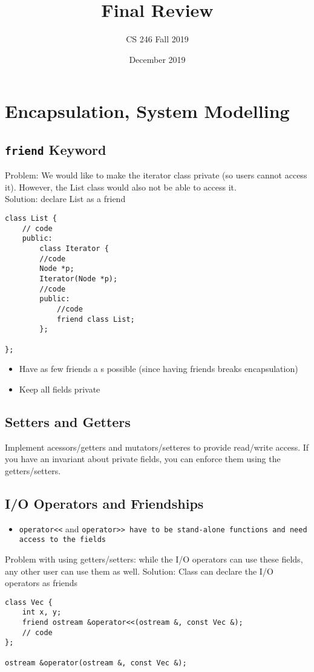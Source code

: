 \documentclass[12pt]{article}
\title{Final Review}
\author{CS 246 Fall 2019}
\date{December 2019}
\begin{document}
\maketitle

\tableofcontents\newpage

\section{Encapsulation, System Modelling}
\subsection{\lstinline{friend} Keyword}
Problem: We would like to make the iterator class private (so users cannot access it). However, the List class would also not be able to access it.\\
Solution: declare List as a friend
\begin{lstlisting}
class List {
    // code
    public:
        class Iterator {
        //code
        Node *p;
        Iterator(Node *p);
        //code
        public:
            //code
            friend class List;
        };

};
\end{lstlisting}
\begin{itemize}
    \item Have as few friends a  s possible (since having friends breaks encapsulation)
    \item Keep all fields private
\end{itemize}

\subsection{Setters and Getters}
Implement acessors/getters and mutators/setteres to provide read/write access. If you have an invariant about private fields, you can enforce them using the getters/setters.

\subsection{I/O Operators and Friendships}
\begin{itemize}
    \item \lstinline{operator<<} and \lstinline{operator>> have to be stand-alone functions and need access to the fields}
\end{itemize}
Problem with using getters/setters: while the I/O operators can use these fields, any other user can use them as well.
Solution: Class can declare the I/O operators as friends
\begin{lstlisting}
class Vec {
    int x, y;
    friend ostream &operator<<(ostream &, const Vec &);
    // code
};

ostream &operator(ostream &, const Vec &); 
\end{lstlisting}
\end{document}
